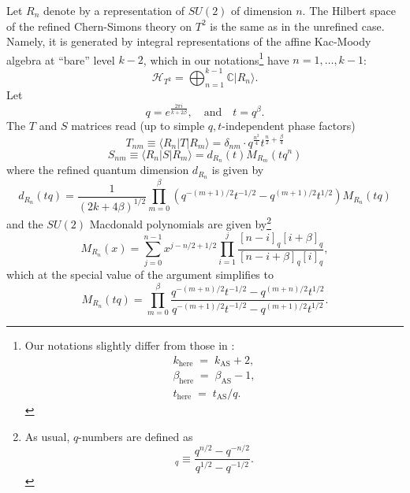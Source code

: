 \documentclass[hyper,letterpaper]{JHEP3}
\newcommand{\C}{{\mathbb C}}
\def\CH{{\mathcal H}}
\begin{document}
Let $R_n$ denote by a representation of $SU(2)$ of dimension $n$. The Hilbert space of the refined
Chern-Simons theory \cite{Aganagic:2011sg} on $T^2$ is the same as in the unrefined case.
Namely, it is generated by integral representations of the affine Kac-Moody algebra at ``bare'' level $k-2$,
which in our notations\footnote{Our notations slightly differ from those in \cite{Aganagic:2011sg}:
\begin{equation}
	\begin{array}{c}
		k_\text{here} \; = \; k_\text{AS}+2, \\
		\beta_\text{here} \; = \; \beta_\text{AS}-1, \\
		t_\text{here} \; = \; t_\text{AS}/q.
	\end{array}		
\end{equation}
} have $n = 1,\ldots,k-1$:
\begin{equation}
	\CH_{T^2}=\bigoplus_{n=1}^{k-1} \C |R_n\rangle.
\end{equation}
Let
\begin{equation}
	q=e^{\frac{2\pi i}{k+2\beta}},\quad\text{and} \quad t=q^\beta.
\end{equation}
The $T$ and $S$ matrices read (up to simple $q,t$-independent phase factors)
\begin{equation}
	T_{nm}\equiv \langle R_n |T|R_m\rangle=
	\delta_{nm}\cdot q^{\frac{n^2}{4}}t^{\frac{n}{2}+\frac{\beta}{4}}
\end{equation}
\begin{equation}
	S_{nm}\equiv \langle R_n |S|R_m\rangle=d_{R_n}(t)M_{R_m}(tq^n)
\end{equation}
where the refined quantum dimension $d_{R_n}$ is given by
\begin{equation}
	d_{R_n}(tq)=\frac{1}{(2k+4\beta)^{1/2}}
		\prod_{m=0}^{\beta} (q^{-(m+1)/2}t^{-1/2}-q^{(m+1)/2}t^{1/2})M_{R_n}(tq)
\end{equation}
and the $SU(2)$ Macdonald polynomials are given by\footnote{As usual, $q$-numbers are defined as \begin{equation}[n]_q \equiv \frac{q^{n/2}-q^{-n/2}}{q^{1/2}-q^{-1/2}}. \end{equation}}
\begin{equation}
	M_{R_n}(x)=\sum_{j=0}^{n-1}x^{j-n/2+1/2}
	\prod_{i=1}^j\frac{[n-i]_q[i+\beta]_q}{[n-i+\beta]_q[i]_q},
\end{equation}
which at the special value of the argument simplifies to
\begin{equation}
	M_{R_n}(tq)=\prod_{m=0}^\beta
	\frac{q^{-(m+n)/2}t^{-1/2}-q^{(m+n)/2}t^{1/2}}{q^{-(m+1)/2}t^{-1/2}-q^{(m+1)/2}t^{1/2}}.
\end{equation}
\end{document}

